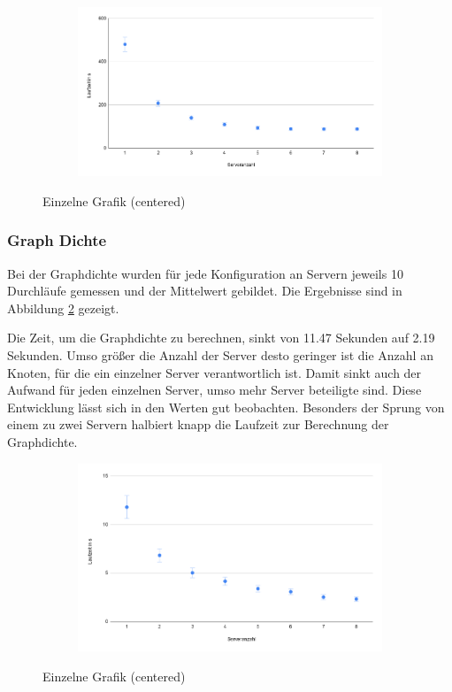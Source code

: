 \begin{figure}
  \centering
  \begin{subfigure}[b]{1.0\textwidth}
    \includegraphics[width=1.0\linewidth]{img/eval_load.png}
  \end{subfigure}
  \caption{Einzelne Grafik (centered)}
  \label{eval:load}
\end{figure}

\subsubsection{Graph Dichte}

Bei der Graphdichte wurden für jede Konfiguration an Servern jeweils 10 Durchläufe gemessen und der Mittelwert gebildet. Die Ergebnisse sind in Abbildung \ref{eval:density} gezeigt.

Die Zeit, um die Graphdichte zu berechnen, sinkt von 11.47 Sekunden auf 2.19 Sekunden. Umso größer die Anzahl der Server desto geringer ist die Anzahl an Knoten, für die ein einzelner Server verantwortlich ist. Damit sinkt auch der Aufwand für jeden einzelnen Server, umso mehr Server beteiligte sind. 
Diese Entwicklung lässt sich in den Werten gut beobachten. Besonders der Sprung von einem zu zwei Servern halbiert knapp die Laufzeit zur Berechnung der Graphdichte.

\begin{figure}
  \centering
  \begin{subfigure}[b]{1.0\textwidth}
    \includegraphics[width=1.0\linewidth]{img/eval_density.png}
  \end{subfigure}
  \caption{Einzelne Grafik (centered)}
  \label{eval:density}
\end{figure}



